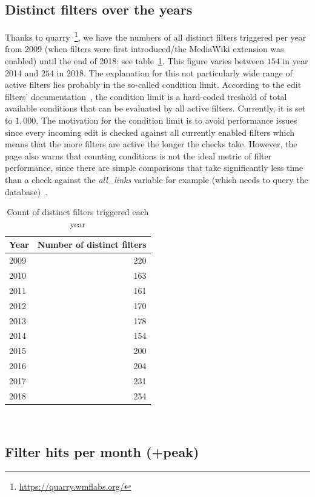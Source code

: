\subsection{Distinct filters over the years}
Thanks to quarry~\footnote{\url{https://quarry.wmflabs.org/}}, we have the numbers of all distinct filters triggered per year
from 2009 (when filters were first introduced/the MediaWiki extension was enabled) until the end of 2018: see table~\ref{tab:active-filters-count}.
This figure varies between $154$ in year 2014 and $254$ in 2018.
The explanation for this not particularly wide range of active filters lies probably in the so-called condition limit.
According to the edit filters' documentation~\cite{Wikipedia:EditFilterDocumentation}, the condition limit is a hard-coded treshold of total available conditions that can be evaluated by all active filters.
Currently, it is set to $1,000$.
The motivation for the condition limit is to avoid performance issues since every incoming edit is checked against all currently enabled filters which means that the more filters are active the longer the checks take.
However, the page also warns that counting conditions is not the ideal metric of filter performance, since there are simple comparisons that take significantly less time than a check against the \emph{all\_links} variable for example (which needs to query the database)~\cite{Wikipedia:EditFilterDocumentation}.

\begin{table}
  \centering
  \begin{tabular}{l r }
    Year & Number of distinct filters \\
    \hline
    2009 & 220 \\
    2010 & 163 \\
    2011 & 161 \\
    2012 & 170 \\
    2013 & 178 \\
    2014 & 154 \\
    2015 & 200 \\
    2016 & 204 \\
    2017 & 231 \\
    2018 & 254 \\
  \end{tabular}
  \caption{Count of distinct filters triggered each year}~\label{tab:active-filters-count}
\end{table}

\subsection{Filter hits per month (+peak)}

